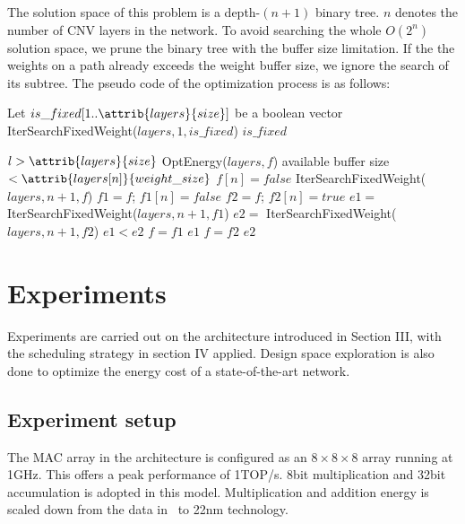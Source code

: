 \documentclass[10pt, conference]{IEEEtran}
\begin{document}
    The solution space of this problem is a depth-$(n+1)$ binary tree. $n$ denotes the number of CNV layers in the network. To avoid searching the whole $O(2^n)$ solution space, we prune the binary tree with the buffer size limitation. If the the weights on a path already exceeds the weight buffer size, we ignore the search of its subtree. The pseudo code of the optimization process is as follows:
    
    \begin{codebox}
    \li Let $is\_fixed[1 .. \attrib{layers}{size}]$ be a boolean vector
    \li IterSearchFixedWeight($layers, 1, is\_fixed$)
    \li \Return $is\_fixed$
    \end{codebox}
    
    \begin{codebox}
    \li \If $l > \attrib{layers}{size}$
    \li	\Do
         \Return OptEnergy($layers, f$)
      \End
    \li \If available buffer size $< \attrib{layers[n]}{weight\_size}$
    \li	\Do
         $f[n] = false$
    \li 	\Return IterSearchFixedWeight($layers, n+1, f$)
      \End
    \li $f1 = f$; $f1[n] = false$
    \li $f2 = f$; $f2[n] = true$
    \li $e1 =$ IterSearchFixedWeight($layers, n+1, f1$)
    \li $e2 =$ IterSearchFixedWeight($layers, n+1, f2$)
    \li \If $e1 < e2$
    \li	\Do
         $f = f1$
    \li 	\Return $e1$
    \li	\Else
    \li 	$f = f2$
    \li 	\Return $e2$
      \End
    \end{codebox}
    
    \section{Experiments}
    
    
    
    Experiments are carried out on the architecture introduced in Section III, with the scheduling strategy in section IV applied. Design space exploration is also done to optimize the energy cost of a state-of-the-art network.
    
    \subsection{Experiment setup}
    The MAC array in the architecture is configured as an $8\times8\times8$ array running at 1GHz. This offers a peak performance of 1TOP/s. 8bit multiplication and 32bit accumulation is adopted in this model. Multiplication and addition energy is scaled down from the data in~\cite{mac_energy} to 22nm technology. 
    
\end{document}
